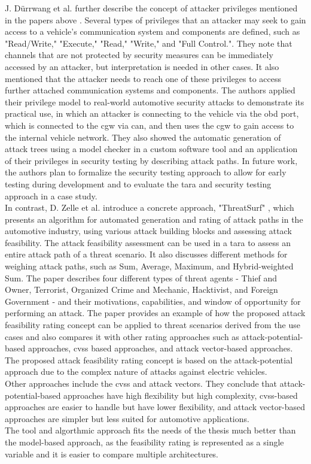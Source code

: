 J. Dürrwang et al. further describe the concept of attacker privileges mentioned in the papers above \cite{attacker_privileges}.
Several types of privileges that an attacker may seek to gain access to a vehicle's communication system and components are defined, such as "Read/Write," "Execute," "Read," "Write," and "Full Control.".
They note that channels that are not protected by security measures can be immediately accessed by an attacker, but interpretation is needed in other cases. 
It also mentioned that the attacker needs to reach one of these privileges to access further attached communication systems and components.
The authors applied their privilege model to real-world automotive security attacks to demonstrate its practical use, in which
an attacker is connecting to the vehicle via the \acrshort{obd} port, which is connected to the \acrshort{cgw} via \acrshort{can}, and then uses the \acrshort{cgw} to gain access to the internal vehicle network.
They also showed the automatic generation of attack trees using a model checker in a custom software tool and an application of their privileges in security testing by describing attack paths. 
In future work, the authors plan to formalize the security testing approach to allow for early testing during development and to evaluate the \acrshort{tara} and security testing approach in a case study.\\

In contrast, D. Zelle et al. introduce a concrete approach, "ThreatSurf" \cite{threat_surf}, which presents an algorithm for automated generation and rating of 
attack paths in the automotive industry, using various attack building blocks and assessing attack feasibility.
The attack feasibility assessment can be used in a \acrshort{tara} to assess an entire attack path of a threat scenario.
It also discusses different methods for weighing attack paths, such as Sum, Average, Maximum, and Hybrid-weighted Sum. 
The paper describes four different types of threat agents - Thief and Owner, Terrorist, Organized Crime and Mechanic, Hacktivist, and Foreign Government - 
and their motivations, capabilities, and window of opportunity for performing an attack. 
The paper provides an example of how the proposed attack feasibility rating concept can be applied to threat scenarios derived from the use cases and also 
compares it with other rating approaches such as attack-potential-based approaches, \acrshort{cvss} based approaches, and attack vector-based approaches.
The proposed attack feasibility rating concept is based on the attack-potential approach due to the complex nature of attacks against electric vehicles.\\
Other approaches include the \acrshort{cvss} and attack vectors.
They conclude that attack-potential-based approaches have high flexibility but high complexity, 
\acrshort{cvss}-based approaches are easier to handle but have lower flexibility, and attack vector-based approaches are simpler but less suited for automotive applications.\\
The tool and algorthmic approach fits the needs of the thesis much better than the model-based approach, as the feasibility rating is represented as a single variable and it is easier to compare multiple architectures.\\

